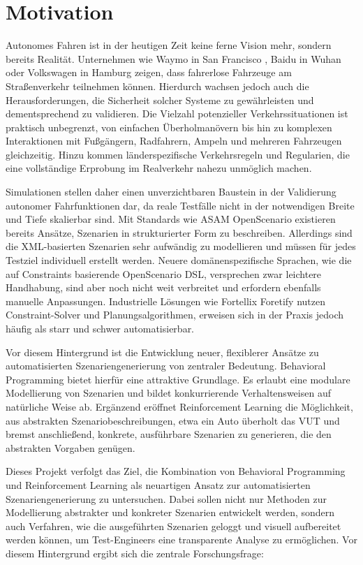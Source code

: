\chapter{Motivation}
\label{chap:motivation}
Autonomes Fahren ist in der heutigen Zeit keine ferne Vision mehr, sondern bereits Realität. Unternehmen wie Waymo in San Francisco \cite{WaymoRobotaxis2025}, Baidu in Wuhan \cite{BaiduRobotaxi2024} oder Volkswagen in Hamburg \cite{VolkswagenRobotaxis2025} zeigen, dass fahrerlose Fahrzeuge am Straßenverkehr teilnehmen können. Hierdurch wachsen jedoch auch die Herausforderungen, die Sicherheit solcher Systeme zu gewährleisten und dementsprechend zu validieren. Die Vielzahl potenzieller Verkehrssituationen ist praktisch unbegrenzt, von einfachen Überholmanövern bis hin zu komplexen Interaktionen mit Fußgängern, Radfahrern, Ampeln und mehreren Fahrzeugen gleichzeitig. Hinzu kommen länderspezifische Verkehrsregeln und Regularien, die eine vollständige Erprobung im Realverkehr nahezu unmöglich machen.

Simulationen stellen daher einen unverzichtbaren Baustein in der Validierung autonomer Fahrfunktionen dar, da reale Testfälle nicht in der notwendigen Breite und Tiefe skalierbar sind. Mit Standards wie ASAM OpenScenario existieren bereits Ansätze, Szenarien in strukturierter Form zu beschreiben. Allerdings sind die XML-basierten Szenarien sehr aufwändig zu modellieren und müssen für jedes Testziel individuell erstellt werden. Neuere domänenspezifische Sprachen, wie die auf Constraints basierende OpenScenario DSL, versprechen zwar leichtere Handhabung, sind aber noch nicht weit verbreitet und erfordern ebenfalls manuelle Anpassungen. Industrielle Lösungen wie Fortellix Foretify nutzen Constraint-Solver und Planungsalgorithmen, erweisen sich in der Praxis jedoch häufig als starr und schwer automatisierbar.

Vor diesem Hintergrund ist die Entwicklung neuer, flexiblerer Ansätze zu automatisierten Szenariengenerierung von zentraler Bedeutung. Behavioral Programming bietet hierfür eine attraktive Grundlage. Es erlaubt eine modulare Modellierung von Szenarien und bildet konkurrierende Verhaltensweisen auf natürliche Weise ab. Ergänzend eröffnet Reinforcement Learning die Möglichkeit, aus abstrakten Szenariobeschreibungen, etwa ein Auto überholt das VUT und bremst anschließend, konkrete, ausführbare Szenarien zu generieren, die den abstrakten Vorgaben genügen.

Dieses Projekt verfolgt das Ziel, die Kombination von Behavioral Programming und Reinforcement Learning als neuartigen Ansatz zur automatisierten Szenariengenerierung zu untersuchen. Dabei sollen nicht nur Methoden zur Modellierung abstrakter und konkreter Szenarien entwickelt werden, sondern auch Verfahren, wie die ausgeführten Szenarien geloggt und visuell aufbereitet werden können, um Test-Engineers eine transparente Analyse zu ermöglichen. Vor diesem Hintergrund ergibt sich die zentrale Forschungsfrage:

